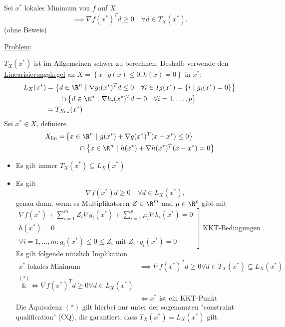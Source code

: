 \begin{satz}
\label{thm:lokalesminimumsatz}
	Sei $x^{*}$ lokales Minimum von $f$ auf $X$
	\[
		\implies \nabla f(x^{*})^{T}d \geq 0 \quad \forall d \in T_{X}(x^{*})
	.\] 
	(ohne Beweis)
\end{satz}

\underline{Problem}:

$T_{X}(x^{*})$ ist im Allgemeinen schwer zu berechnen. 
Deshalb verwende den\\ \underline{Linearisierungskegel} an $X=\left\{ x ~|~ g(x) \leq 0, h(x) = 0 \right\}$ in $x^{*}$:
\begin{align*}
	L_{X}(x^{*}) &= \left\{ d \in \R^{n} ~|~ \nabla g_{i}(x^{*})^{T}d \leq 0 \quad \forall i \in Ig(x^{*})= \left\{ i ~|~ g_{i}(x^{*}) = 0\right\}\right\}\\
				 &\qquad\cap \left\{ d \in \R^{n} ~|~ \nabla h_{i}(x^{*})^{T}d = 0 \quad \forall i=1, \ldots, p \right\} \\
				 &= T_{X_{\text{lin}}}(x^{*})
\end{align*}
Sei $x^{*} \in X$, definiere
\begin{align*}
	X_{\text{lin}}=&\left\{ x \in \R^{n} ~|~ g(x^{*}) + \nabla  g(x^{*})^{T}(x-x^{*}) \leq 0\right\} \\
	&\qquad\cap \left\{ x \in \R^{n} ~|~ h(x^{*}) + \nabla h(x^{*})^{T}(x-x^{*}) = 0 \right\} 
\end{align*}

\begin{itemize}
	\item Es gilt immer $T_{X}(x^{*}) \subseteq L_{X}(x^{*})$
	\item Es gilt 
		\[
		\nabla f(x^{*})d \geq 0 \quad \forall d \in L_{X}(x^{*})
		,\] genau dann, wenn es Multiplikatoren $Z \in \R^{m}$ und $\mu \in \R^{p}$ gibt mit
		\[
		\left.
		\begin{array}{r}
			\nabla f(x^{*}) + \sum_{i=1}^{m}Z_{i}\nabla g_{i}(x^{*}) + \sum_{i=1}^{p}\mu _{i}\nabla h_{i}(x^{*})=0 \\
			h(x^{*}) = 0 \\
			\forall i=1, \ldots, m \colon g_{i}(x^{*})\leq 0 \leq Z_{i} \text{ mit } Z_{i}\cdot g_{i}(x^{*}) = 0
		\end{array}
		\right] \text{ KKT-Bedingungen }
		.\] 
		Es gilt folgende nützlich Implikation
		\begin{align*}
			x^{*} \text{ lokales Minimum } &\implies \nabla f(x^{*})^{T}d \geq 0 \forall d \in T_{X}(x^{*}) \subseteq L_{X}(x^{*}) \\
			\overset{(\ast)}&{\iff}  \nabla f(x^{*})^{T}d \geq 0 \forall d \in L_{X}(x^{*}) \\
										   &\iff x^{*} \text{ ist ein KKT-Punkt }
		\end{align*}
		Die Äquivalenz $(\ast)$ gilt hierbei nur unter der sogenannten "constraint qualification" (CQ), die garantiert, dass $T_{X}(x^{*}) = L_{X}(x^{*})$ gilt.
\end{itemize}

